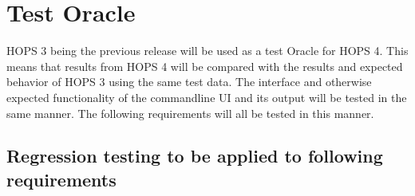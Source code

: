%
%
\section{Test Oracle}
\label{sec:oracle}
HOPS 3 being the previous release will be used as a test Oracle for HOPS 4. This means that
results from HOPS 4 will be compared with the results and expected behavior of HOPS 3 using
the same test data. The interface and otherwise expected functionality of the commandline UI
and its output will be tested in the same manner. The following requirements will all be tested
in this manner.


\subsection{Regression testing to be applied to following requirements}
\label{sec:oraclereqs}

